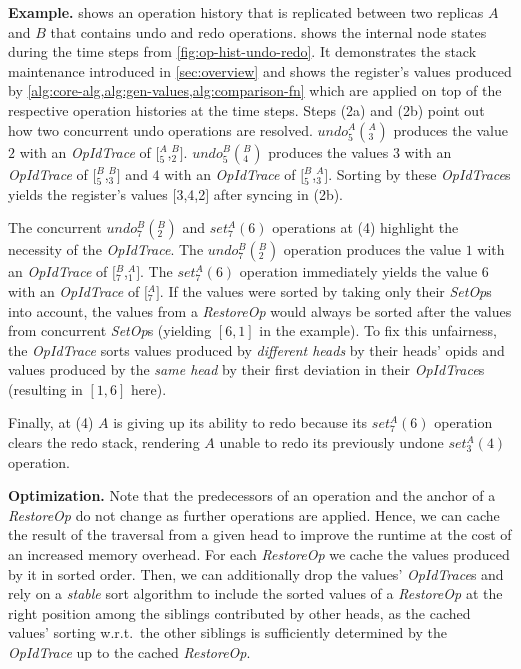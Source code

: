 \documentclass[sigplan,natbib=false,review]{acmart}
\newcommand{\opid}[2]{$\mathit{_{#1}^{#2}}$}
\newcommand{\setop}[4][set]{$\mathit{#1_{#2}^{#3}}{(#4)}$}
\newcommand{\undop}[5][undo]{$\mathit{#1_{#2}^{#3}}{(_{#4}^{#5})}$}
\newcommand{\stack}[1]{$[$#1$]$}
\newcommand{\setopkind}{\textit{SetOp}}
\newcommand{\restopkind}{\textit{RestoreOp}}
\newcommand{\opidtrace}{\textit{OpIdTrace}}
\begin{document}
\textbf{Example.}\label{sec:algo-example}
 shows an operation history that is replicated
between two replicas $A$ and $B$ that contains undo and redo operations.
 shows the internal node states during the time steps
from \cref{fig:op-hist-undo-redo}.
It demonstrates the stack maintenance introduced in \cref{sec:overview} and
shows the register's values produced by
\cref{alg:core-alg,alg:gen-values,alg:comparison-fn} which are applied on top
of the respective operation histories at the time steps.
Steps (2a) and (2b) point out how two concurrent undo operations are resolved.
\undop{5}{A}{3}{A} produces the value $2$ with an \opidtrace{} of
\stack{\opid{5}{A},\opid{2}{B}}.
\undop{5}{B}{4}{B} produces the values $3$ with an \opidtrace{} of
\stack{\opid{5}{B},\opid{3}{B}}
and $4$ with an \opidtrace{} of
\stack{\opid{5}{B},\opid{3}{A}}.
Sorting by these \opidtrace{}s yields the register's values \stack{3,4,2}
after syncing in (2b).

The concurrent \undop{7}{B}{2}{B} and \setop{7}{A}{6} operations at (4) highlight
the necessity of the \opidtrace{}.
The \undop{7}{B}{2}{B} operation produces the value $1$ with an \opidtrace{} of
\stack{\opid{7}{B},\opid{1}{A}}.
The \setop{7}{A}{6} operation immediately yields the value $6$ with an
\opidtrace{} of \stack{\opid{7}{A}}.
If the values were sorted by taking only their \setopkind{}s into account,
the values from a \restopkind{} would always be sorted after
the values from concurrent \setopkind{}s (yielding $[6, 1]$ in the example).
To fix this unfairness, the \opidtrace{} sorts values produced by
\emph{different heads} by their heads' \glspl*{opid}
and values produced by the \emph{same head}
by their first deviation in their \opidtrace{}s (resulting in $[1, 6]$ here).

Finally, at (4) $A$ is giving up its ability to redo because its
\setop{7}{A}{6} operation clears the redo stack,
rendering $A$ unable to redo its previously undone \setop{3}{A}{4} operation.

\textbf{Optimization.}\label{sec:opt}
Note that the predecessors of an operation and the
anchor of a \restopkind{} do not change as further operations are applied.
Hence, we can cache the result of the traversal from a given head
to improve the runtime at the cost of an increased memory overhead.
For each \restopkind{} we cache the values produced by it in sorted order.
Then, we can additionally drop the values'
\opidtrace{}s and rely on a \emph{stable} sort algorithm to include the sorted
values of a \restopkind{} at the right position among the siblings contributed
by other heads, as the cached values' sorting w.r.t.\ the other siblings
is sufficiently determined by the \opidtrace{} up to the cached \restopkind{}.
\end{document}
